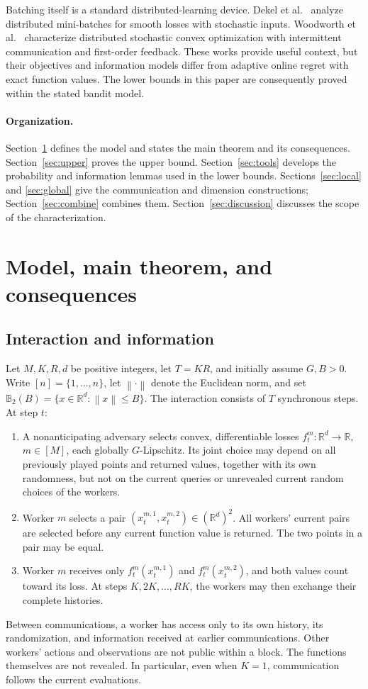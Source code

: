 \documentclass[11pt,a4paper]{article}
\numberwithin{equation}{section}
\theoremstyle{remark}
\newcommand{\R}{\mathbb R}
\newcommand{\norm}[1]{\left\lVert #1\right\rVert}
\newcommand{\B}{\mathbb B_2}
\begin{document}
Batching itself is a standard distributed-learning device. Dekel et
al.~\cite{DGSX12} analyze distributed mini-batches for smooth losses
with stochastic inputs. Woodworth et al.~\cite{WBSS21} characterize
distributed stochastic convex optimization with intermittent
communication and first-order feedback. These works provide useful
context, but their objectives and information models differ from
adaptive online regret with exact function values. The lower bounds
in this paper are consequently proved within the stated bandit model.

\paragraph{Organization.}
Section~\ref{sec:model} defines the model and states the main theorem
and its consequences. Section~\ref{sec:upper} proves the upper bound.
Section~\ref{sec:tools} develops the probability and information lemmas
used in the lower bounds. Sections~\ref{sec:local} and
\ref{sec:global} give the communication and dimension constructions;
Section~\ref{sec:combine} combines them. Section~\ref{sec:discussion}
discusses the scope of the characterization.

\section{Model, main theorem, and consequences}
\label{sec:model}

\subsection{Interaction and information}

Let $M,K,R,d$ be positive integers, let $T=KR$, and initially assume
$G,B>0$. Write $[n]=\{1,\ldots,n\}$, let $\norm{\cdot}$ denote the
Euclidean norm, and set $\B(B)=\{x\in\R^d:\norm{x}\le B\}$. The
interaction consists of $T$ synchronous steps. At step $t$:
\begin{enumerate}
\item A nonanticipating adversary selects convex, differentiable losses
  $f_t^m:\R^d\to\R$, $m\in[M]$, each globally $G$-Lipschitz. Its
  joint choice may depend on all previously played points and returned
  values, together with its own randomness, but not on the current
  queries or unrevealed current random choices of the workers.
\item Worker $m$ selects a pair $(x_t^{m,1},x_t^{m,2})\in(\R^d)^2$.
  All workers' current pairs are selected before any current function
  value is returned. The two points in a pair may be equal.
\item Worker $m$ receives only $f_t^m(x_t^{m,1})$ and
  $f_t^m(x_t^{m,2})$, and both values count toward its loss. At steps
  $K,2K,\ldots,RK$, the workers may then exchange their complete
  histories.
\end{enumerate}
Between communications, a worker has access only to its own history,
its randomization, and information received at earlier communications.
Other workers' actions and observations are not public within a block.
The functions themselves are not revealed. In particular, even when
$K=1$, communication follows the current evaluations.
\end{document}
